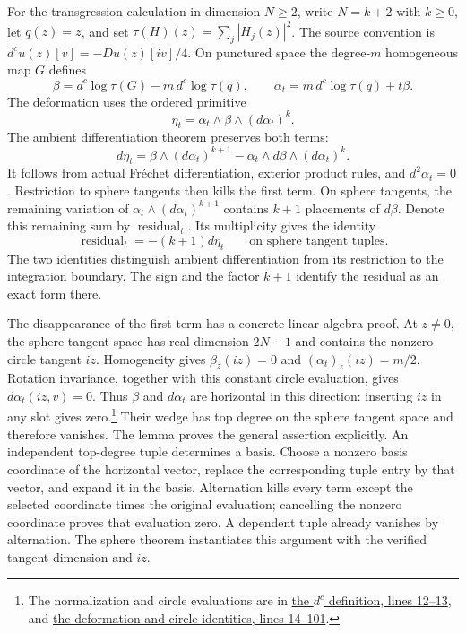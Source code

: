 For the transgression calculation in dimension $N\geq2$, write
$N=k+2$ with $k\geq0$, let $q(z)=z$, and set
$\tau(H)(z)=\sum_j|H_j(z)|^2$. The source convention is
$d^cu(z)[v]=-Du(z)[iv]/4$. On punctured space the degree-$m$
homogeneous map $G$ defines
\[
 \beta=d^c\log\tau(G)-m\,d^c\log\tau(q),\qquad
 \alpha_t=m\,d^c\log\tau(q)+t\beta.
\]
The deformation uses the ordered primitive
\[
  \eta_t=\alpha_t\wedge\beta\wedge(d\alpha_t)^k.
\]
The ambient differentiation theorem preserves both terms:
\[
  d\eta_t=\beta\wedge(d\alpha_t)^{k+1}
       -\alpha_t\wedge d\beta\wedge(d\alpha_t)^k.
\]
It follows from actual Fr\'echet differentiation, exterior product rules, and
$d^2\alpha_t=0$. Restriction to sphere tangents then kills the first term.
On sphere tangents, the remaining variation of $\alpha_t\wedge(d\alpha_t)^{k+1}$ contains $k+1$ placements of $d\beta$. Denote this remaining sum by $\operatorname{residual}_t$.
Its multiplicity gives the identity
\[
  \operatorname{residual}_t=-(k+1)d\eta_t
  \qquad\text{on sphere tangent tuples}.
\]
The two identities distinguish ambient differentiation from its restriction to the integration boundary. The sign and the factor $k+1$ identify the residual as an exact form there.

The disappearance of the first term has a concrete linear-algebra proof.
At $z\ne0$, the sphere tangent space has real dimension $2N-1$ and contains
the nonzero circle tangent $iz$. Homogeneity gives $\beta_z(iz)=0$ and
$(\alpha_t)_z(iz)=m/2$. Rotation invariance, together with this constant
circle evaluation, gives $d\alpha_t(iz,v)=0$.
Thus $\beta$ and $d\alpha_t$ are horizontal in this direction:
inserting $iz$ in any slot gives zero.\footnote{The normalization and
circle evaluations are in
\href{https://github.com/openai/math/blob/fd4aeeb2ee4fc729c18d98444fed42fd0529eeeb/lean/OAI/Analysis/Mahler/HomogeneousFlux.lean\#L12-L13}{the $d^c$ definition, lines 12--13}, and
\href{https://github.com/openai/math/blob/fd4aeeb2ee4fc729c18d98444fed42fd0529eeeb/lean/OAI/Analysis/Mahler/HomogeneousDeformation.lean\#L14-L101}{the deformation and circle identities, lines 14--101}.}
Their wedge has top degree on the sphere tangent space and therefore vanishes. The lemma
 proves the general assertion explicitly.
An independent top-degree tuple determines a basis. Choose a nonzero basis
coordinate of the horizontal vector, replace the corresponding tuple entry
by that vector, and expand it in the basis. Alternation kills every term
except the selected coordinate times the original evaluation; cancelling the
nonzero coordinate proves that evaluation zero. A dependent tuple already
vanishes by alternation. The sphere theorem instantiates this argument with
the verified tangent dimension and $iz$.

